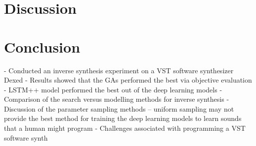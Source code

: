 
\section{Discussion}
\label{sec:inverse-synth-discuss}


\section{Conclusion}

- Conducted an inverse synthesis experiment on a VST software synthesizer Dexed
- Results showed that the GAs performed the best via objective evaluation
- LSTM++ model performed the best out of the deep learning models
- Comparison of the search versus modelling methods for inverse synthesis
- Discussion of the parameter sampling methods -- uniform sampling may not provide the best method for training the deep learning models to learn sounds that a human might program
- Challenges associated with programming a VST software synth